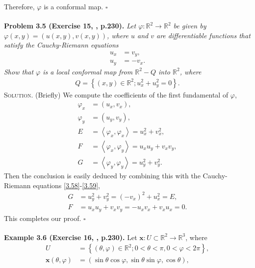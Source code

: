 \documentclass[a4paper]{article}
\numberwithin{equation}{section}
\begin{document}
Therefore, $\varphi$ is a conformal map. \hfill $\square$\\
\\
\textbf{Problem 3.5 (Exercise 15, \cite{2}, p.230).} \textit{Let $\varphi :\mathbb{R}^2\to \mathbb{R}^2$ be given by $\varphi \left( {x,y} \right) = \left( {u\left( {x,y} \right),v\left( {x,y} \right)} \right)$, where $u$ and $v$ are differentiable functions that satisfy the Cauchy-Riemann equations}
\begin{align}
\label{3.58}
{u_x} &= {v_y},\\
{u_y} &=  - {v_x}. \label{3.59}
\end{align}
\textit{Show that $\varphi$ is a local conformal map from $\mathbb{R}^2-Q$ into $\mathbb{R}^2$, where}
\begin{align}
Q = \left\{ {\left( {x,y} \right) \in {\mathbb{R}^2};u_x^2 + u_y^2 = 0} \right\}.
\end{align}
\textsc{Solution.} (Briefly) We compute the coefficients of the first fundamental of $\varphi$,
\begin{align}
{\varphi _x} &= \left( {{u_x},{v_x}} \right),\\
{\varphi _y} &= \left( {{u_y},{v_y}} \right),\\
E &= \left\langle {{\varphi _x},{\varphi _x}} \right\rangle  = u_x^2 + v_x^2,\\
F &= \left\langle {{\varphi _x},{\varphi _y}} \right\rangle  = {u_x}{u_y} + {v_x}{v_y},\\
G &= \left\langle {{\varphi _y},{\varphi _y}} \right\rangle  = u_y^2 + v_y^2.
\end{align}
Then the conclusion is easily deduced by combining this with the Cauchy-Riemann equations \eqref{3.58}-\eqref{3.59},
\begin{align}
G &= u_y^2 + v_y^2 = {\left( { - {v_x}} \right)^2} + u_x^2 = E,\\
F &= {u_x}{u_y} + {v_x}{v_y} =  - {u_x}{v_x} + {v_x}{u_x} = 0.
\end{align}
This completes our proof. \hfill $\square$\\
\\
\textbf{Example 3.6 (Exercise 16, \cite{2}, p.230).} Let $\mathbf{x}:U\subset \mathbb{R}^2\to \mathbb{R}^3$, where
\begin{align}
U &= \left\{ {\left( {\theta ,\varphi } \right) \in {\mathbb{R}^2};0 < \theta  < \pi ,0 < \varphi  < 2\pi } \right\},\\
\mathbf{x}\left( {\theta ,\varphi } \right)& = \left( {\sin \theta \cos \varphi ,\sin \theta \sin \varphi ,\cos \theta } \right),
\end{align}
\end{document}

